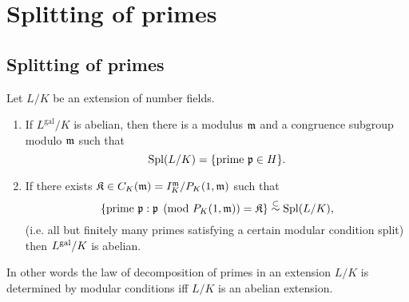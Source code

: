 \section{Splitting of primes}
\subsection{Splitting of primes}
\begin{thm}
Let $L/K$ be an extension of number fields.
\begin{enumerate}
\item
If $L^\text{gal}/K$ is abelian, then there is a modulus $\mathfrak{m}$ and a congruence subgroup modulo $\mathfrak{m}$ such that %
\[\operatorname{Spl}(L/K)= \{\text{prime }\mathfrak{p}\in H\}.\]
\item
If there exists $\mathfrak K\in C_K(\mathfrak{m})= I_{K}^{\mathfrak{m}}/P_{K}(1,\mathfrak{m})$ such that
\[
\left\{{\text{prime }\mathfrak{p}}:{\mathfrak{p}\pmod{P_K(1,\mathfrak{m})}=\mathfrak K}\right\}
\stackrel{\subset}{\sim} \operatorname{Spl}(L/K),
\]
(i.e. all but finitely many primes satisfying a certain modular condition split) then $L^{\text{gal}}/K$ is abelian.
\end{enumerate}
\end{thm}
In other words the law of decomposition of primes in an extension $L/K$ is determined by modular conditions iff $L/K$ is an abelian extension. 
